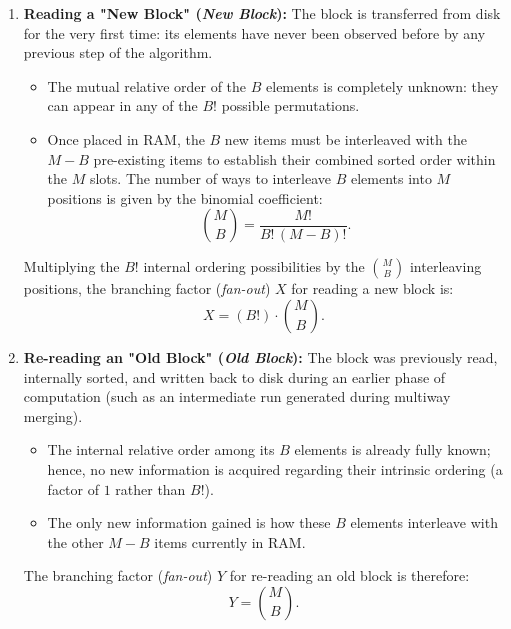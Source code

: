 \begin{enumerate}
  \item \textbf{Reading a "New Block" (\textit{New Block}):}
  The block is transferred from disk for the very first time: its elements have never been observed before by any previous step of the algorithm.
  \begin{itemize}
    \item The mutual relative order of the $B$ elements is completely unknown: they can appear in any of the $B!$ possible permutations.
    \item Once placed in RAM, the $B$ new items must be interleaved with the $M - B$ pre-existing items to establish their combined sorted order within the $M$ slots. The number of ways to interleave $B$ elements into $M$ positions is given by the binomial coefficient:
    \begin{equation}
      \binom{M}{B} = \frac{M!}{B! \, (M - B)!}.
    \end{equation}
  \end{itemize}
  Multiplying the $B!$ internal ordering possibilities by the $\binom{M}{B}$ interleaving positions, the branching factor (\textit{fan-out}) $X$ for reading a new block is:
  \begin{equation}
    X = (B!) \cdot \binom{M}{B}.
    \label{eq:fanout-new-block}
  \end{equation}

  \item \textbf{Re-reading an "Old Block" (\textit{Old Block}):}
  The block was previously read, internally sorted, and written back to disk during an earlier phase of computation (such as an intermediate run generated during multiway merging).
  \begin{itemize}
    \item The internal relative order among its $B$ elements is already fully known; hence, no new information is acquired regarding their intrinsic ordering (a factor of $1$ rather than $B!$).
    \item The only new information gained is how these $B$ elements interleave with the other $M - B$ items currently in RAM.
  \end{itemize}
  The branching factor (\textit{fan-out}) $Y$ for re-reading an old block is therefore:
  \begin{equation}
    Y = \binom{M}{B}.
    \label{eq:fanout-old-block}
  \end{equation}
\end{enumerate}

